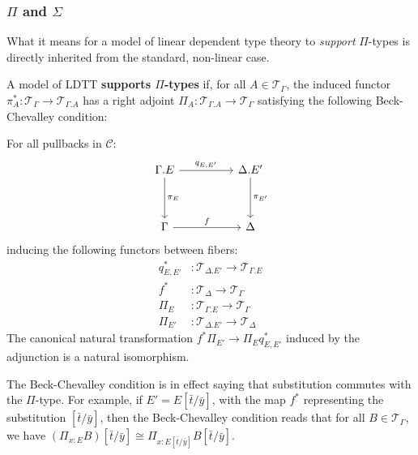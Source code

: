 \subsubsection{$\Pi$ and $\Sigma$}
What it means for a model of linear dependent type theory to \textit{support} $\Pi$-types is directly inherited from the standard, non-linear case.
\begin{defn}A model of LDTT \textbf{supports $\Pi$-types} if, for all $A \in \mathcal{T}_{\Gamma}$, the induced functor $\pi_A^* : \mathcal{T}_{\Gamma} \to \mathcal{T}_{\Gamma.A}$ has a right adjoint $\Pi_A : \mathcal{T}_{\Gamma.A} \to \mathcal{T}_{\Gamma}$ satisfying the following Beck-Chevalley condition:

  
For all pullbacks in $\mathcal{C}$:
  \begin{equation}\label{pb-diag}
    \ti
    \Gamma.E \ar[d, "\pi_E"] \ar[r, "q_{E, E'}"] & \Delta.E' \ar[d, "\pi_{E'}"] \\
    \Gamma \ar[r, "f"] & \Delta
    \kz
  \end{equation}
inducing the following functors between fibers:
\[
  \begin{split}
    q^*_{E, E'} &: \mathcal{T}_{\Delta.E'} \to \mathcal{T}_{\Gamma.E}\\
    f^* &: \mathcal{T}_{\Delta} \to \mathcal{T}_{\Gamma}\\
    \Pi_E &: \mathcal{T}_{\Gamma.E} \to \mathcal{T}_{\Gamma}\\
    \Pi_{E'} &: \mathcal{T}_{\Delta.E'} \to \mathcal{T}_{\Delta}
  \end{split}    
\]
The canonical natural transformation $f^*\Pi_{E'} \to \Pi_{E}q^*_{E, E'}$ induced by the adjunction is a natural isomorphism.


\end{defn}
The Beck-Chevalley condition is in effect saying that substitution commutes with the $\Pi$-type. For example, if $E' = E[\bar t/\bar y]$, with the map $f^*$ representing the substitution $[\bar t/\bar y]$, then the Beck-Chevalley condition reads that for all $B \in \mathcal{T}_{\Gamma}$, we have $(\Pi_{x : E}B)[\bar t/\bar y] \cong \Pi_{x : E[\bar t/\bar y]}B[\bar t/\bar y]$.



